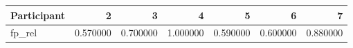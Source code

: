 \begin{tabular}{lrrrrrr}
\toprule
Participant & 2 & 3 & 4 & 5 & 6 & 7 \\
\midrule
fp_rel & 0.570000 & 0.700000 & 1.000000 & 0.590000 & 0.600000 & 0.880000 \\
\bottomrule
\end{tabular}
